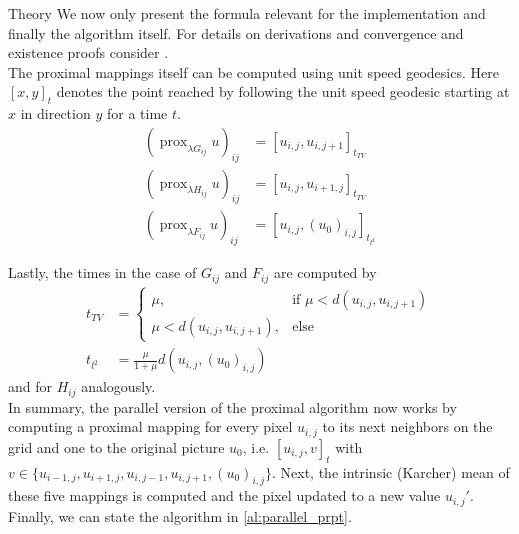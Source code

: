 \begin{chapter}{Theory}
We now only present the formula relevant for the implementation and finally the algorithm itself. For details on derivations and convergence and existence proofs consider \cite{Weinmann}.\\

The proximal mappings itself can be computed using unit speed geodesics. Here $[x,y]_t$ denotes the point reached by
following the unit speed geodesic starting at $x$ in direction $y$ for a time $t$.
\begin{align}
    (\operatorname{prox}_{\lambda G_{ij}}u)_{ij}&=[u_{i,j},u_{i,j+1}]_{t_{TV}} \\
    (\operatorname{prox}_{\lambda H_{ij}}u)_{ij}&=[u_{i,j},u_{i+1,j}]_{t_{TV}} \\
    (\operatorname{prox}_{\lambda F_{ij}}u)_{ij}&=[u_{i,j},(u_0)_{i,j}]_{t_{l^2}}
\end{align}

Lastly, the times in the case of $G_{ij}$ and $F_{ij}$ are computed by
\begin{align}
    t_{TV}&=
    \begin{cases}
	\mu, &\text{if } \mu<d(u_{i,j},u_{i,j+1})\\
	\mu<d(u_{i,j},u_{i,j+1}), & \text{else}
    \end{cases}\\
    t_{l^{2}}&=\frac{\mu}{1+\mu}d(u_{i,j},(u_0)_{i,j})
\end{align}
and for $H_{ij}$ analogously.\\

In summary, the parallel version of the proximal algorithm now works by computing a proximal mapping for every pixel $u_{i,j}$ to its next neighbors on the grid and one
to the original picture $u_0$, i.e. $[u_{i,j}, v]_t$ with $v\in\lbrace u_{i-1,j},u_{i+1,j},u_{i,j-1}, u_{i,j+1}, (u_0)_{i,j}\rbrace$. Next, the intrinsic (Karcher) mean \cite{Karcher} of 
these five mappings is computed and the pixel updated to a new value $u_{i,j}'$.\\

Finally, we can state the algorithm in \ref{al:parallel_prpt}.


\end{chapter}
